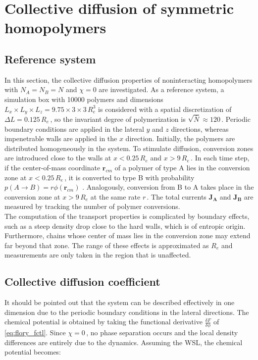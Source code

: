 \documentclass[bachelor,       %
               twoside,        %
               BCOR10mm,       %
                ngerman,english  %
               ]{GAUBM}
\begin{document}
\chapter{Collective diffusion of symmetric homopolymers}

\section{Reference system}

In this section, the collective diffusion properties of noninteracting homopolymers with $N_A=N_B=N$ and $\chi=0$ are investigated. As a reference system, a simulation box with 10000 polymers and dimensions $L_x\times L_y\times L_z=9.75\times3\times3\,R_e^3$ is considered with a spatial discretization of $\Delta L=0.125\,R_e\,$, so the invariant degree of polymerization is $\sqrt{\bar{N}}\approx 120\,$. Periodic boundary conditions are applied in the lateral $y$ and $z$ directions, whereas impenetrable walls are applied in the $x$ direction. Initially, the polymers are distributed homogeneously in the system. To stimulate diffusion, conversion zones are introduced close to the walls at $x<0.25\,R_e$ and $x>9\,R_e\,$. In each time step, if the center-of-mass coordinate $\mathbf r_{cm}$ of a polymer of type A lies in the conversion zone at $x<0.25\,R_e\,$, it is converted to type B with probability $p(A\rightarrow B)=r\phi(\mathbf r_{cm})$ \cite{Dreyer22}. Analogously, conversion from B to A takes place in the conversion zone at $x>9\,R_e$ at the same rate $r\,$. The total currents $\mathbf{J_A}$ and $\mathbf{J_B}$ are measured by tracking the number of polymer conversions. \\
The computation of the transport properties is complicated by boundary effects, such as a steep density drop close to the hard walls, which is of entropic origin. Furthermore, chains whose center of mass lies in the conversion zone may extend far beyond that zone. The range of these effects is approximated as $R_e$ and measurements are only taken in the region that is unaffected. 

\section{Collective diffusion coefficient}

It should be pointed out that the system can be described effectively in one dimension due to the periodic boundary conditions in the lateral directions. The chemical potential is obtained by taking the functional derivative $\frac{\delta F}{\delta\phi}$ of \eqref{eq:flory_fctl}. Since $\chi=0\,$, no phase separation occurs and the local density differences are entirely due to the dynamics. Assuming the WSL, the chemical potential becomes:
\end{document}
